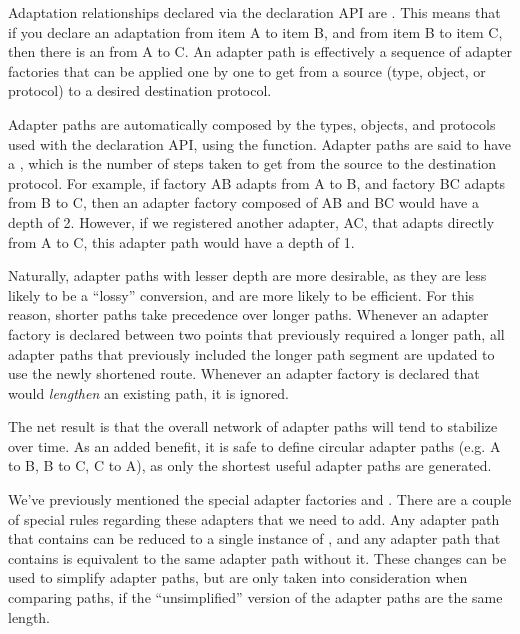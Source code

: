 \begin{verbatim%
}
\begin{verbatim%
}
\begin{verbatim%
}
\begin{verbatim%
}
Adaptation relationships declared via the declaration API are
.  This means that if you declare an adaptation from item A
to item B, and from item B to item C, then there is an 
from A to C.  An adapter path is effectively a sequence of adapter factories
that can be applied one by one to get from a source (type, object, or protocol)
to a desired destination protocol.

Adapter paths are automatically composed by the types, objects, and protocols
used with the declaration API, using the  function.
Adapter paths are said to have a , which is the number of steps
taken to get from the source to the destination protocol.  For example, if
factory AB adapts from A to B, and factory BC adapts from B to C, then an
adapter factory composed of AB and BC would have a depth of 2.  However, if we
registered another adapter, AC, that adapts directly from A to C, this adapter
path would have a depth of 1.

Naturally, adapter paths with lesser depth are more desirable, as they are less
likely to be a ``lossy'' conversion, and are more likely to be efficient.  For
this reason, shorter paths take precedence over longer paths.  Whenever an
adapter factory is declared between two points that previously required a
longer path, all adapter paths that previously included the longer path segment
are updated to use the newly shortened route.  Whenever an adapter factory is
declared that would \emph{lengthen} an existing path, it is ignored.

The net result is that the overall network of adapter paths will tend to
stabilize over time.  As an added benefit, it is safe to define circular
adapter paths (e.g. A to B, B to C, C to A), as only the shortest useful
adapter paths are generated.



We've previously mentioned the special adapter factories
 and .  There are a
couple of special rules regarding these adapters that we need to add.  Any
adapter path that contains  can be reduced to a
single instance of , and any adapter path that
contains  is equivalent to the same adapter path
without it. These changes can be used to simplify adapter paths, but are only
taken into consideration when comparing paths, if the ``unsimplified'' version
of the adapter paths are the same length.


\end{verbatim%
}
\end{verbatim%
}
\end{verbatim%
}
\end{verbatim%
}
